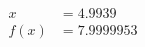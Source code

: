 \documentclass[preview]{standalone}
\begin{document}
\begin{align*}
x &= 4.9939\\f(x) &= 7.9999953
\end{align*}
\end{document}
